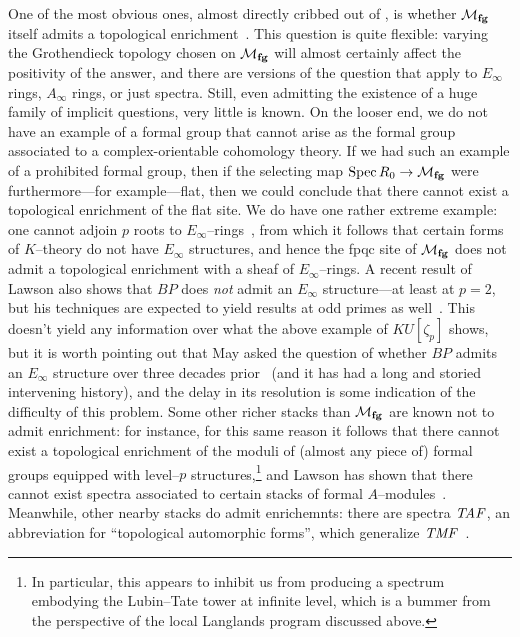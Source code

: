 One of the most obvious ones, almost directly cribbed out of , is whether \(\mathcal{M}_{\mathbf{fg}}\) itself admits a topological enrichment~\cite{GoerssRealizingFamilies}.  This question is quite flexible: varying the Grothendieck topology chosen on \(\mathcal{M}_{\mathbf{fg}}\) will almost certainly affect the positivity of the answer, and there are versions of the question that apply to \(E_\infty\) rings, \(A_\infty\) rings, or just spectra.  Still, even admitting the existence of a huge family of implicit questions, very little is known.  On the looser end, we do not have an example of a formal group that cannot arise as the formal group associated to a complex-orientable cohomology theory.  If we had such an example of a prohibited formal group, then if the selecting map \(\operatorname{Spec} R_0 \to \mathcal{M}_{\mathbf{fg}}\) were furthermore---for example---flat, then we could conclude that there cannot exist a topological enrichment of the flat site.  We do have one rather extreme example: one cannot adjoin \(p\){\th} roots to \(E_\infty\)--rings~\cite{SchwaenzlRolandVogt,Devalapurkar}, from which it follows that certain forms of \(K\)--theory do not have \(E_\infty\) structures, and hence the fpqc site of \(\mathcal{M}_{\mathbf{fg}}\) does not admit a topological enrichment with a sheaf of \(E_\infty\)--rings.  A recent result of Lawson also shows that \(BP\) does \emph{not} admit an \(E_\infty\) structure---at least at \(p = 2\), but his techniques are expected to yield results at odd primes as well~\cite{LawsonSecondaryPowerOps}.  This doesn't yield any information over what the above example of \(KU[\zeta_p]\) shows, but it is worth pointing out that May asked the question of whether \(BP\) admits an \(E_\infty\) structure over three decades prior~\cite{MayProblemsInLoopspaceTheory} (and it has had a long and storied intervening history), and the delay in its resolution is some indication of the difficulty of this problem.  Some other richer stacks than \(\mathcal{M}_{\mathbf{fg}}\) are known not to admit enrichment: for instance, for this same reason it follows that there cannot exist a topological enrichment of the moduli of (almost any piece of) formal groups equipped with level--\(p\) structures,\footnote{In particular, this appears to inhibit us from producing a spectrum embodying the Lubin--Tate tower at infinite level, which is a bummer from the perspective of the local Langlands program discussed above.} and Lawson has shown that there cannot exist spectra associated to certain stacks of formal \(A\)--modules~\cite{LawsonRealizability}.  Meanwhile, other nearby stacks do admit enrichemnts: there are spectra \(\mathit{TAF}\), an abbreviation for ``topological automorphic forms'', which generalize \(\mathit{TMF}\)~\cite{BehrensLawson}.

